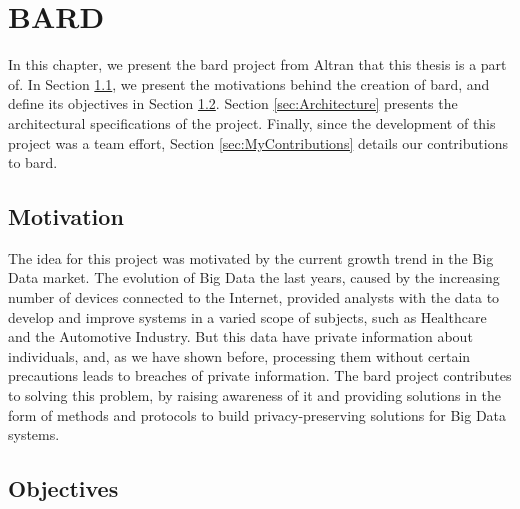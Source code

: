 %

\acresetall

\chapter{BARD}
\label{ch:BARD}


In this chapter, we present the \ac{bard} project from Altran that this thesis is a part of. 
In Section \ref{sec:Motivation}, we present the motivations behind the creation of \ac{bard}, and define its objectives in Section \ref{sec:Objectives}.
Section \ref{sec:Architecture} presents the architectural specifications of the project.
Finally, since the development of this project was a team effort, Section \ref{sec:MyContributions} details our contributions to \ac{bard}.



\section{Motivation}
\label{sec:Motivation}

The idea for this project was motivated by the current growth trend in the Big Data market. The evolution of Big Data the last years, caused by the increasing number of devices connected to the Internet, provided analysts with the data to develop and improve systems in a varied scope of subjects, such as Healthcare and the Automotive Industry. But this data have private information about individuals, and, as we have shown before, processing them without certain precautions leads to breaches of private information. The \ac{bard} project contributes to solving this problem, by raising awareness of it and providing solutions in the form of methods and protocols to build privacy-preserving solutions for Big Data systems.

\section{Objectives}
\label{sec:Objectives}


